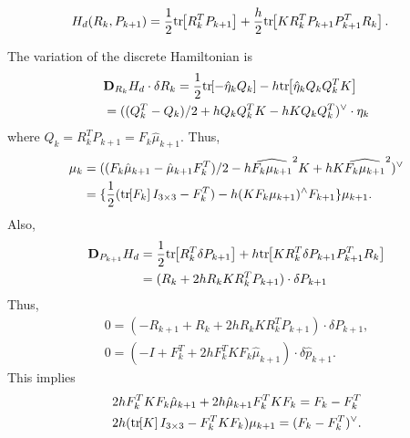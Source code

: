 \documentclass[letterpaper, 10pt, conference]{ieeeconf}
\newcommand{\bracket}[1]{\ensuremath{\left[ #1 \right]}}
\newcommand{\tr}[1]{\mbox{tr}\ensuremath{\negthickspace\bracket{#1}}}
\newcommand{\D}{\ensuremath{\mathbf{D}}}
\begin{document}
\begin{align*}
    H_d (R_k, P_{k+1}) 
    & = \frac{1}{2}\tr{R_k^T P_{k+1}}   + \frac{h}{2} \tr{ K R_k^T P_{k+1} P_{k+1}^T R_k }.
\end{align*}

The variation of the discrete Hamiltonian is
\begin{align*}
    & \D_{R_k} H_d \cdot \delta R_k =\frac{1}{2} \tr{-\hat\eta_k Q_k} - h \tr{\hat\eta_k Q_kQ_k^T K } \\
    & = ( (Q_k^T- Q_k)/2 +h Q_kQ_k^TK  - hK Q_k Q_k^T)^\vee\cdot \eta_k
\end{align*}
where $Q_k = R_k^T P_{k+1} = F_k \hat\mu_{k+1}$.
Thus,
\begin{align}
    \mu_k 
          & = ((F_k\hat\mu_{k+1}-\hat\mu_{k+1}F_k^T)/2 - h \widehat{F_k\mu_{k+1}}^2 K +  h K \widehat{F_k\mu_{k+1}}^2)^\vee\nonumber \\
          & = \{ \frac{1}{2}(\tr{F_k}I_{3\times 3}-F_k^T) -h (KF_k\mu_{k+1})^\wedge F_{k+1}  \}  \mu_{k+1}.
\end{align}
Also,
\begin{align*}
    \D_{P_{k+1}} H_d & = \frac{1}{2}\tr{ R_k^T \delta P_{k+1}} + h\tr{KR_k^T \delta P_{k+1} P_{k+1}^T R_k} \\
                     & = ( R_k + 2h R_k K R_k^T P_{k+1}) \cdot \delta P_{k+1}
\end{align*}
Thus, 
\begin{gather*}
0 = (- R_{k+1} +  R_k + 2h R_k K R_k^T P_{k+1}) \cdot \delta P_{k+1},\\
0 = (- I +  F_k^T + 2h F_k^T K F_k \hat\mu_{k+1}) \cdot \delta \hat p_{k+1}.
\end{gather*}
This implies
\begin{gather}
2h F_k^T K F_k \hat\mu_{k+1} + 2h \hat\mu_{k+1} F_k^T K F_k = F_k - F_k^T\nonumber\\
2h (\tr{K}I_{3\times 3} - F_k^T K F_k)\mu_{k+1} = (F_k- F_k^T)^\vee.
\end{gather}




\end{document}
